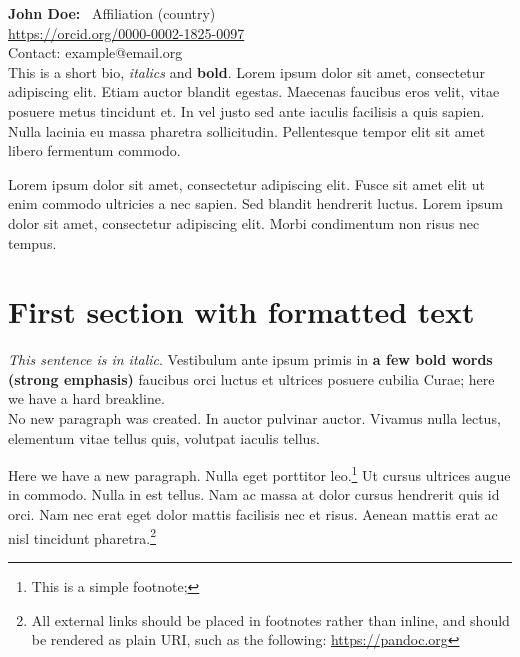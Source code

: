 \documentclass[american,a4paper,]{article}
\begin{document}
\vspace{2em} %
\vspace*{\fill} %
\renewenvironment{abstract}
 {\par\noindent\textbf{\abstractname}\ \ignorespaces}
 {\par\medskip}
\begin{samepage}
\renewcommand{\abstractname}{John Doe:}
\begin{abstract} %
\small Affiliation (country)
 \\ \url{https://orcid.org/0000-0002-1825-0097}\\ Contact: example@email.org \\ This is a short bio, \emph{italics} and \textbf{bold}. Lorem ipsum dolor
sit amet, consectetur adipiscing elit. Etiam auctor blandit egestas.
Maecenas faucibus eros velit, vitae posuere metus tincidunt et. In vel
justo sed ante iaculis facilisis a quis sapien. Nulla lacinia eu massa
pharetra sollicitudin. Pellentesque tempor elit sit amet libero
fermentum commodo.
\end{abstract}
\end{samepage}


\newpage
Lorem ipsum dolor sit amet, consectetur adipiscing elit. Fusce sit amet
elit ut enim commodo ultricies a nec sapien. Sed blandit hendrerit
luctus. Lorem ipsum dolor sit amet, consectetur adipiscing elit. Morbi
condimentum non risus nec tempus.

\hypertarget{first-section-with-formatted-text}{%
\section{First section with formatted
text}\label{first-section-with-formatted-text}}

\emph{This sentence is in italic}. Vestibulum ante ipsum primis in
\textbf{a few bold words (strong emphasis)} faucibus orci luctus et
ultrices posuere cubilia Curae; here we have a hard breakline.\\
No new paragraph was created. In auctor pulvinar auctor. Vivamus nulla
lectus, elementum vitae tellus quis, volutpat iaculis tellus.

Here we have a new paragraph. Nulla eget porttitor leo.\footnote{This is
  a simple footnote;} Ut cursus ultrices augue in commodo. Nulla in est
tellus. Nam ac massa at dolor cursus hendrerit quis id orci. Nam nec
erat eget dolor mattis facilisis nec et risus. Aenean mattis erat ac
nisl tincidunt pharetra.\footnote{All external links should be placed in
  footnotes rather than inline, and should be rendered as plain URI,
  such as the following: \url{https://pandoc.org}}
\end{document}
